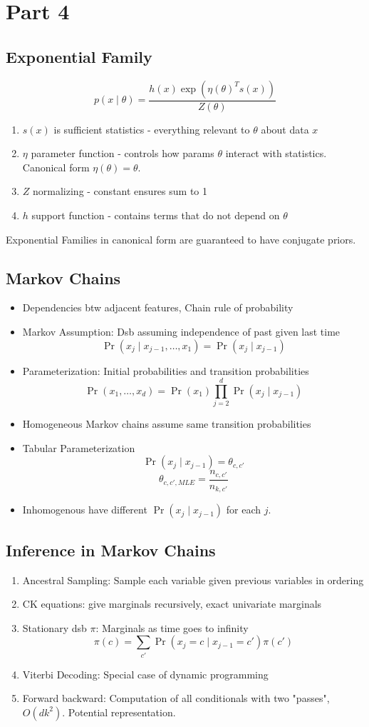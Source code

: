 \section{Part 4}
\subsection*{Exponential Family}
\[p(x\mid\theta)=\frac{h(x)\exp(\eta(\theta)^T s(x))}{Z(\theta)}\]
\begin{enumerate}
    \item $s(x)$ is sufficient statistics - everything relevant to $\theta$ about data $x$
    \item $\eta$ parameter function - controls how params $\theta$ interact with statistics. Canonical form $\eta(\theta)=\theta$.
    \item $Z$ normalizing - constant ensures sum to 1
    \item $h$ support function - contains terms that do not depend on $\theta$
\end{enumerate}
Exponential Families in canonical form are guaranteed to have conjugate priors.
\subsection*{Markov Chains}
\begin{itemize}
    \item Dependencies btw adjacent features, Chain rule of probability
    \item Markov Assumption: Dsb assuming independence of past given last time
    \[\Pr(x_j\mid x_{j-1},\dots,x_1)=\Pr(x_j\mid x_{j-1})\]
    \item Parameterization: Initial probabilities and transition probabilities
    \[\Pr(x_1,\dots,x_d)=\Pr(x_1)\prod_{j=2}^d \Pr(x_j\mid x_{j-1})\]
    \item Homogeneous Markov chains assume same transition probabilities
    \item Tabular Parameterization
    \[\Pr(x_j\mid x_{j-1})=\theta_{c,c'}\]
    \[\theta_{c,c',MLE}=\frac{n_{c,c'}}{n_{k,c'}}\]
    \item Inhomogenous have different $\Pr(x_j\mid x_{j-1})$ for each $j$.
\end{itemize}
\subsection*{Inference in Markov Chains}
\begin{enumerate}
    \item Ancestral Sampling: Sample each variable given previous variables in ordering
    \item CK equations: give marginals recursively, exact univariate marginals
    \item Stationary dsb $\pi$: Marginals as time goes to infinity
    \[\pi(c)=\sum_{c'}\Pr(x_j=c\mid x_{j-1}=c')\pi(c')\]
    \item Viterbi Decoding: Special case of dynamic programming
    \item Forward backward: Computation of all conditionals with two "passes", $O(dk^2)$. Potential representation.
\end{enumerate}

